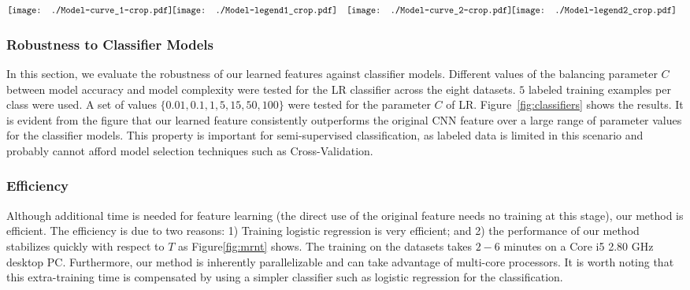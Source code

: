 \documentclass[preprint,12pt,3p]{elsarticle}
\begin{document}
\begin{figure*} 
  \centering
   $ \begin{array}{cccc}
\hspace{-2mm}
\texttt{[image: ./Model-curve\_1-crop.pdf]} &  \hspace{-4mm}
\texttt{[image: ./Model-legend1\_crop.pdf]} &  
\texttt{[image: ./Model-curve\_2-crop.pdf]} &  \hspace{-4mm}
\texttt{[image: ./Model-legend2\_crop.pdf]} \\
\end{array}$
\caption{Comparison of our learned feature to the CNN feature~\cite{deep:bmvc14}, with different LR models.}
  \label{fig:classifiers}
\end{figure*}





\subsubsection{Robustness to Classifier Models}
In this section, we evaluate the robustness of our learned features
against classifier models. Different values of the balancing parameter
$C$ between model accuracy and model complexity were tested for the LR
classifier across the eight datasets.  $5$ labeled training examples
per class were used.  A set of values $\{0.01, 0.1, 1, 5, 15, 50,
100\}$ were tested for the parameter $C$ of LR. Figure~\ref{fig:classifiers}
shows the results. It is evident from the figure that our learned
feature consistently outperforms the original CNN feature over a large
range of parameter values for the classifier models. This property is
important for semi-supervised classification, as labeled data is
limited in this scenario and probably cannot afford model selection
techniques such as Cross-Validation.


 \subsubsection{Efficiency}
 Although additional time is needed for feature learning (the direct use of
 the original feature needs no training at this stage), our method is efficient. The efficiency is due to two reasons: 1) Training
 logistic regression is very efficient; and 2) the performance of our
 method stabilizes quickly with respect to $T$ as Figure\ref{fig:mrnt}
 shows. The training on the datasets takes $2-6$ minutes on a Core i5
 2.80 GHz desktop PC. Furthermore, our method is inherently
 parallelizable and can take advantage of multi-core processors. It is
 worth noting that this extra-training time is compensated by using a
 simpler classifier such as logistic regression for the
 classification.
\end{document}
